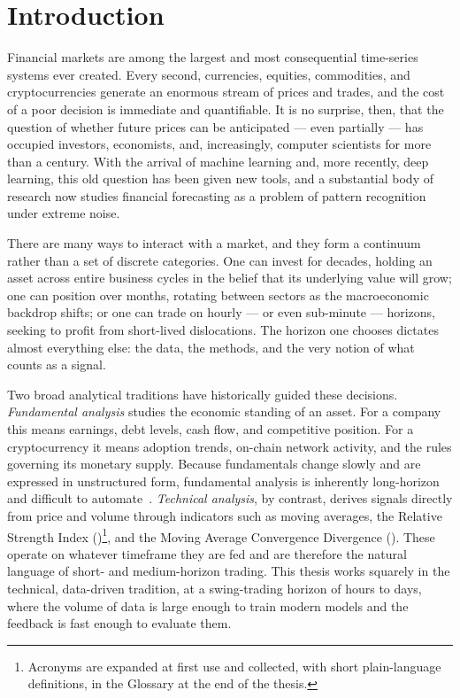 

\chapter{Introduction}
\label{01_Introduction}

Financial markets are among the largest and most consequential time-series systems ever created. Every second, currencies, equities, commodities, and cryptocurrencies generate an enormous stream of prices and trades, and the cost of a poor decision is immediate and quantifiable. It is no surprise, then, that the question of whether future prices can be anticipated --- even partially --- has occupied investors, economists, and, increasingly, computer scientists for more than a century. With the arrival of machine learning and, more recently, deep learning, this old question has been given new tools, and a substantial body of research now studies financial forecasting as a problem of pattern recognition under extreme noise.


There are many ways to interact with a market, and they form a continuum rather than a set of discrete categories. One can invest for decades, holding an asset across entire business cycles in the belief that its underlying value will grow; one can position over months, rotating between sectors as the macroeconomic backdrop shifts; or one can trade on hourly --- or even sub-minute --- horizons, seeking to profit from short-lived dislocations. The horizon one chooses dictates almost everything else: the data, the methods, and the very notion of what counts as a signal.


Two broad analytical traditions have historically guided these decisions. \textit{Fundamental analysis} studies the economic standing of an asset. For a company this means earnings, debt levels, cash flow, and competitive position. For a cryptocurrency it means adoption trends, on-chain network activity, and the rules governing its monetary supply. Because fundamentals change slowly and are expressed in unstructured form, fundamental analysis is inherently long-horizon and difficult to automate~\cite{nti2020systematic}. \textit{Technical analysis}, by contrast, derives signals directly from price and volume through indicators such as moving averages, the Relative Strength Index ()\footnote{Acronyms are expanded at first use and collected, with short plain-language definitions, in the Glossary at the end of the thesis.}, and the Moving Average Convergence Divergence (). These operate on whatever timeframe they are fed and are therefore the natural language of short- and medium-horizon trading. This thesis works squarely in the technical, data-driven tradition, at a swing-trading horizon of hours to days, where the volume of data is large enough to train modern models and the feedback is fast enough to evaluate them.


